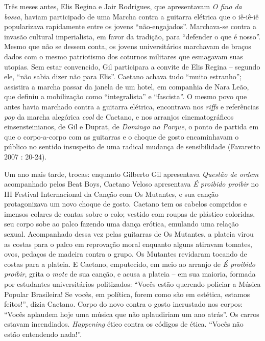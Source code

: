 Três meses antes, Elis Regina e Jair Rodrigues, que apresentavam \emph{O
fino da bossa}, haviam participado de uma Marcha contra a guitarra
elétrica que o iê-iê-iê popularizava rapidamente entre os jovens
``não-engajados''. Marchava-se contra a invasão cultural imperialista,
em favor da tradição, para ``defender o que é nosso''. Mesmo que não se
dessem conta, os jovens universitários marchavam de braços dados com o
mesmo patriotismo dos coturnos militares que esmagavam suas utopias. Sem
estar convencido, Gil participara a convite de Elis Regina -- segundo
ele, ``não sabia dizer não para Elis''. Caetano achava tudo ``muito
estranho''; assistira a marcha passar da janela de um hotel, em
companhia de Nara Leão, que definiu a mobilização como ``integralista''
e ``fascista''. O mesmo povo que antes havia marchado contra a guitarra
elétrica, encontrava nos \emph{riffs }e referências \emph{pop} da marcha
alegórica \emph{cool }de Caetano, e nos arranjos cinematográficos
einsensteinianos, de Gil e Duprat, de \emph{Domingo no Parque}, o
ponto de partida em que o corpo-a-corpo com as guitarras e o choque de
gosto encaminhavam o público no sentido insuspeito de uma radical
mudança de sensibilidade (Favaretto 2007 : 20-24).

Um ano mais tarde, trocas: enquanto Gilberto Gil apresentava
\emph{Questão de ordem }acompanhado pelos Beat Boys, Caetano\emph{
}Veloso apresentava \emph{É proibido proibir} no III Festival
Internacional da Canção com Os Mutantes, e sua canção protagonizava um
novo choque de gosto. Caetano tem os cabelos compridos e imensos colares
de contas sobre o colo; vestido com roupas de plástico coloridas, seu
corpo sobe ao palco fazendo uma dança erótica, emulando uma relação
sexual. Acompanhado dessa vez pelas guitarras de Os Mutantes, a plateia
virou as costas para o palco em reprovação moral enquanto alguns
atiravam tomates, ovos, pedaços de madeira contra o grupo. Os Mutantes
revidaram tocando de costas para a plateia. E Caetano, emputecido, em
meio ao arranjo de \emph{É proibido proibir}, grita o \emph{mote }de sua
canção, e acusa a plateia -- em sua maioria, formada por estudantes
universitários politizados: ``Vocês estão querendo policiar a Música
Popular Brasileira! Se vocês, em política, forem como são em estética,
estamos feitos!'', dizia Caetano. Corpo do novo contra o gosto
incrustado nos corpos: ``Vocês aplaudem hoje uma música que não
aplaudiriam um ano atrás''. Os carros estavam incendiados.
\emph{Happening }ético contra os códigos de ética. ``Vocês não estão
entendendo nada!''.

